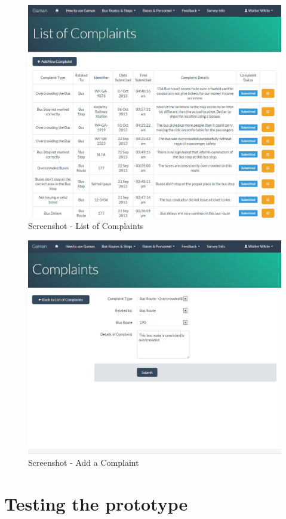 \begin {figure} [h!]
\centering
\includegraphics[scale=0.2]{listComplaints}
\caption [Screenshot - List of Complaints] {Screenshot - List of Complaints}
\label {image-listComplaints}
\end {figure}

\begin {figure} [h!]
\centering
\includegraphics[scale=0.2]{addComplaint}
\caption [Screenshot - Add a Complaint] {Screenshot - Add a Complaint}
\label {image-addComplaint}
\end {figure}


\section{Testing the prototype}

\paragraph{} 